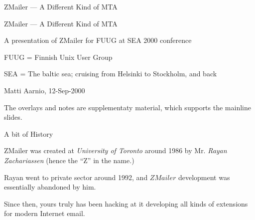 \documentclass[a4paper,landscape]{slides}
\newcommand{\ZM}{ZMailer}
\begin{document}
\pagestyle{plain}


\begin{slide}

\begin{center}
 ZMailer --- A Different Kind of MTA
\end{center}

\vfill

\begin{center}
\end{center}

\vfill

\end{slide}


\begin{overlay}

\begin{center}
 ZMailer --- A Different Kind of MTA
\end{center}

\vfill

  A presentation of ZMailer for  FUUG at SEA 2000 conference

     FUUG = Finnish Unix User Group

     SEA  = The baltic sea; cruising from Helsinki to Stockholm, and back

 Matti Aarnio, 12-Sep-2000

The overlays and notes are supplementaty material, which supports
the mainline slides.

\end{overlay}



\begin{slide}
\centerline{\large A bit of History}

\vfill
\ZM{} was created at {\it University of Toronto} around 1986 by
Mr. {\it Rayan Zachariassen} (hence the ``Z'' in the name.)

Rayan went to private sector around 1992, and $ZMailer$ development
was essentially abandoned by him.

Since then, yours truly has been hacking at it developing all kinds
of extensions for modern Internet email.

\vfill

\end{slide}
\end{document}

